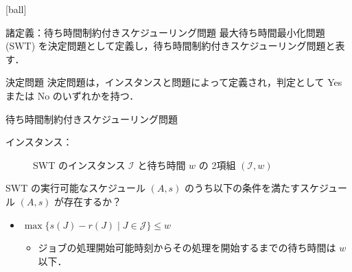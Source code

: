 \documentclass[dvipdfmx]{beamer}
\begin{document}
    [ball]
    \begin{frame}{諸定義：待ち時間制約付きスケジューリング問題}
      最大待ち時間最小化問題  (SWT) を\alert{決定問題}として定義し，\alert{待ち時間制約付きスケジューリング問題}と表す．
      \begin{block}{決定問題}
        決定問題は，\alert{インスタンス}と\alert{問題}によって定義され，判定として \alert{Yes} または \alert{No} のいずれかを持つ．
      \end{block}

      \begin{block}{待ち時間制約付きスケジューリング問題}
        \begin{description}
          \item[インスタンス：] SWT のインスタンス $\mathcal{I}$ と待ち時間 $w$ の 2項組 $(\mathcal{I}, w)$
        \end{description}
        \begin{description}
          \setlength{\leftskip}{-8mm}
          \item[問題：] SWT の実行可能なスケジュール $(A,s)$ のうち以下の条件を満たすスケジュール $(A,s)$ が存在するか？
          \vspace{-2mm}
        \end{description}
        \begin{itemize}
          \item {$\max\big\{s(J) - r(J) \mid J \in \mathcal{J}\big\} \le w$}
          \begin{itemize}
            \item ジョブの処理開始可能時刻からその処理を開始するまでの待ち時間は $w$ 以下．
          \end{itemize}
        \end{itemize}
      \end{block}
    \end{frame}
\end{document}

